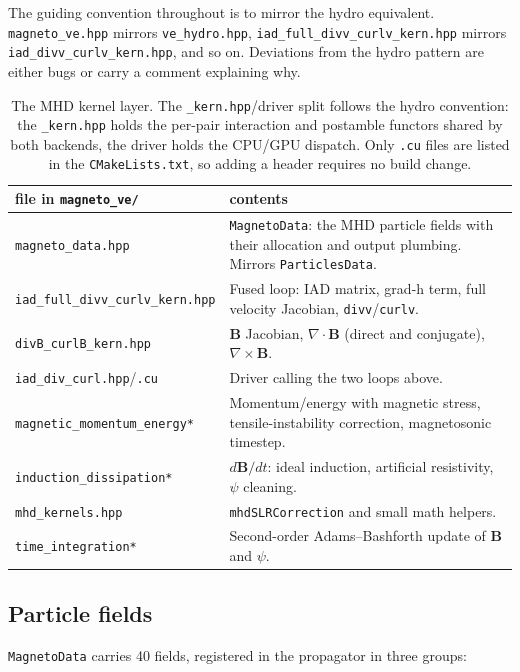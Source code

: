 The guiding convention throughout is to mirror the hydro equivalent. \texttt{magneto\_ve.hpp} mirrors \texttt{ve\_hydro.hpp}, \texttt{iad\_full\_divv\_curlv\_kern.hpp} mirrors \texttt{iad\_divv\_curlv\_kern.hpp}, and so on. Deviations from the hydro pattern are either bugs or carry a comment explaining why.

\begin{table}[htbp]
\centering
\small
\setlength{\tabcolsep}{4pt}
\begin{tabularx}{\linewidth}{@{}lX@{}}
\toprule
file in \texttt{magneto\_ve/} & contents \\
\midrule
\texttt{magneto\_data.hpp}                & \texttt{MagnetoData}: the MHD particle fields with their allocation and output plumbing. Mirrors \texttt{ParticlesData}. \\
\texttt{iad\_full\_divv\_curlv\_kern.hpp} & Fused loop: IAD matrix, grad-h term, full velocity Jacobian, \texttt{divv}/\texttt{curlv}. \\
\texttt{divB\_curlB\_kern.hpp}            & $\mathbf{B}$ Jacobian, $\nabla\cdot\mathbf{B}$ (direct and conjugate), $\nabla\times\mathbf{B}$. \\
\texttt{iad\_div\_curl.hpp}/\texttt{.cu}  & Driver calling the two loops above. \\
\texttt{magnetic\_momentum\_energy*}      & Momentum/energy with magnetic stress, tensile-instability correction, magnetosonic timestep. \\
\texttt{induction\_dissipation*}          & $d\mathbf{B}/dt$: ideal induction, artificial resistivity, $\psi$ cleaning. \\
\texttt{mhd\_kernels.hpp}                 & \texttt{mhdSLRCorrection} and small math helpers. \\
\texttt{time\_integration*}               & Second-order Adams--Bashforth update of $\mathbf{B}$ and $\psi$. \\
\bottomrule
\end{tabularx}
\caption{The MHD kernel layer. The \texttt{\_kern.hpp}/driver split follows the hydro convention: the \texttt{\_kern.hpp} holds the per-pair interaction and postamble functors shared by both backends, the driver holds the CPU/GPU dispatch. Only \texttt{.cu} files are listed in the \texttt{CMakeLists.txt}, so adding a header requires no build change.}
\end{table}

\subsection{Particle fields}
\texttt{MagnetoData} carries 40 fields, registered in the propagator in three groups:

